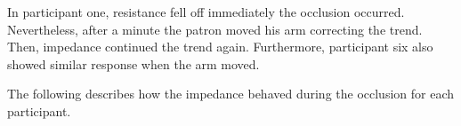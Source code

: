 In participant one, resistance fell off immediately the occlusion occurred. Nevertheless, after a minute the patron moved his arm correcting the trend. Then, impedance continued the trend again. Furthermore,  participant six also showed similar response when the arm moved. 

The following describes how the impedance behaved during the occlusion for each participant. 


